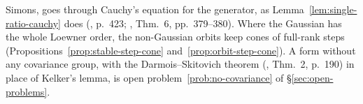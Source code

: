 \begin{remark}
Simons, goes through Cauchy's equation for the generator, as Lemma~\ref{lem:single-ratio-cauchy} does
(, p.~423; , Thm.~6, pp.~379--380).
Where the Gaussian has the whole Loewner order, the non-Gaussian orbits keep cones of full-rank steps
(Propositions~\ref{prop:stable-step-cone} and~\ref{prop:orbit-step-cone}).
A form without any
covariance group, with the Darmois--Skitovich theorem (, Thm.~2,
p.~190) in place of Kelker's lemma, is open
problem~\ref{prob:no-covariance} of \S\ref{sec:open-problems}.
\end{remark}

